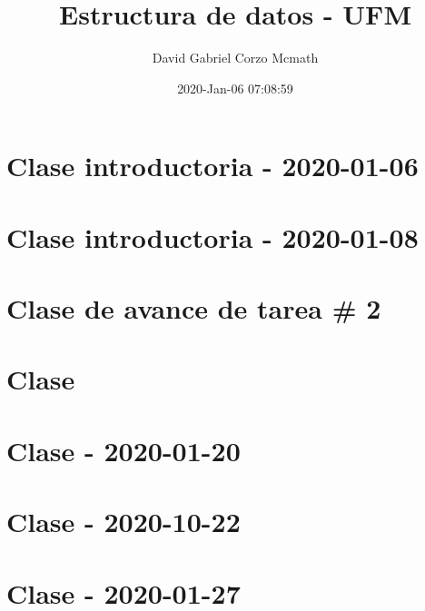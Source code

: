 \documentclass{book}
\title{Estructura de datos - UFM}
\author{David Gabriel Corzo Mcmath}
\date{2020-Jan-06 07:08:59}
\begin{document}
\maketitle
\tableofcontents

\chapter{Clase introductoria - 2020-01-06}


\chapter{Clase introductoria - 2020-01-08}


\chapter{Clase de avance de tarea \# 2}


\chapter{Clase }


\chapter{Clase - 2020-01-20}


\chapter{Clase - 2020-10-22}



\chapter{Clase - 2020-01-27}

\end{document}
